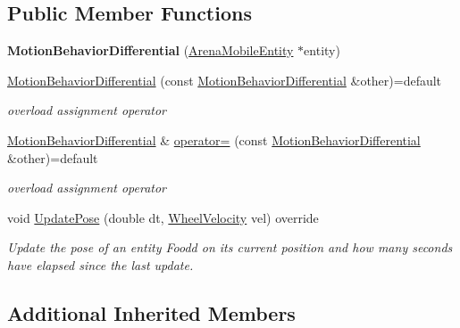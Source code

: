 \subsection*{Public Member Functions}
\begin{DoxyCompactItemize}
\item 
{\bfseries Motion\+Behavior\+Differential} (\hyperlink{classArenaMobileEntity}{Arena\+Mobile\+Entity} $\ast$entity)\hypertarget{classMotionBehaviorDifferential_a8815791ac85212945862454560279d28}{}\label{classMotionBehaviorDifferential_a8815791ac85212945862454560279d28}

\item 
\hyperlink{classMotionBehaviorDifferential_aeaa480aac3de205e1d177c4b4ad73ed6}{Motion\+Behavior\+Differential} (const \hyperlink{classMotionBehaviorDifferential}{Motion\+Behavior\+Differential} \&other)=default\hypertarget{classMotionBehaviorDifferential_aeaa480aac3de205e1d177c4b4ad73ed6}{}\label{classMotionBehaviorDifferential_aeaa480aac3de205e1d177c4b4ad73ed6}

\begin{DoxyCompactList}\small\item\em overload assignment operator \end{DoxyCompactList}\item 
\hyperlink{classMotionBehaviorDifferential}{Motion\+Behavior\+Differential} \& \hyperlink{classMotionBehaviorDifferential_aaf4edbc2e349cb8cdbb033b16b1aef22}{operator=} (const \hyperlink{classMotionBehaviorDifferential}{Motion\+Behavior\+Differential} \&other)=default\hypertarget{classMotionBehaviorDifferential_aaf4edbc2e349cb8cdbb033b16b1aef22}{}\label{classMotionBehaviorDifferential_aaf4edbc2e349cb8cdbb033b16b1aef22}

\begin{DoxyCompactList}\small\item\em overload assignment operator \end{DoxyCompactList}\item 
void \hyperlink{classMotionBehaviorDifferential_a929c3a05aa2072acf2a508109b1259ef}{Update\+Pose} (double dt, \hyperlink{structWheelVelocity}{Wheel\+Velocity} vel) override
\begin{DoxyCompactList}\small\item\em Update the pose of an entity Foodd on its current position and how many seconds have elapsed since the last update. \end{DoxyCompactList}\end{DoxyCompactItemize}
\subsection*{Additional Inherited Members}


